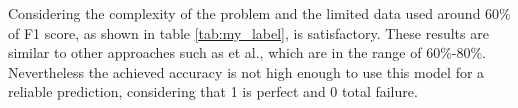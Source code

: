 Considering the complexity of the problem and the limited data used around 60\% of F1 score, as shown in table \ref{tab:my_label}, is satisfactory. These results are similar to other approaches such as \cite{wang2017deep} et al., which are in the range of 60\%-80\%. Nevertheless the achieved accuracy is not high enough to use this model for a reliable prediction, considering that 1 is perfect and 0 total failure.